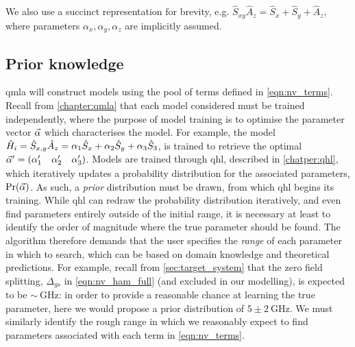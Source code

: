 We also use a succinct representation for brevity, e.g. $\hat{S}_{xy}\hat{A}_z =  \hat{S}_x + \hat{S}_y + \hat{A}_z$, 
    where parameters $\alpha_x, \alpha_y, \alpha_z$ are implicitly assumed. 

\subsection{Prior knowledge}

\gls{qmla} will construct models using the pool of terms defined in \cref{eqn:nv_terms}. 
Recall from \cref{chapter:qmla} that each model considered must be trained independently, 
    where the purpose of model training is to optimise the parameter vector $\vec{\alpha}$ which characterises the model. 
For example, the model 
    $\hat{H}_i = \hat{S}_{x,y} \hat{A}_{z} = \alpha_1 \hat{S}_x  + \alpha_2 \hat{S}_y + \alpha_3 \hat{S}_3$,
    is trained to retrieve the optimal $\vec{\alpha}^{\prime} = \begin{matrix}(\alpha_1^{\prime} & \alpha_2^{\prime} & \alpha_3^{\prime})\end{matrix}$. 
Models are trained through \gls{qhl}, described in \cref{chatper:qhl}, 
    which iteratively updates a probability distribution for the associated parameters, $\Pr(\vec{\alpha})$. 
As such, a \emph{prior} distribution must be drawn, from which \gls{qhl} begins its training. 
While \gls{qhl} can redraw the probability distribution iteratively, and even find parameters entirely outside of the initial range, 
    it is necessary at least to identify the order of magnitude where the true parameter should be found. 
The algorithm therefore demands that the user specifies the \emph{range} of each parameter in which to search, 
    which can be based on domain knowledge and theoretical predictions. 
For example, recall from \cref{sec:target_system} that the zero field splitting, $\Delta_{gs}$ in \cref{eqn:nv_ham_full} (and excluded in our modelling),
    is expected to be $\sim \SI{}{\giga\hertz}$: in order to provide a reasonable chance at learning the true parameter,
    here we would propose a prior distribution of $5 \pm 2 \SI{}{\giga\hertz}$.
We must similarly identify the rough range in which we reasonably expect to find parameters associated with each term in \cref{eqn:nv_terms}.
\par

